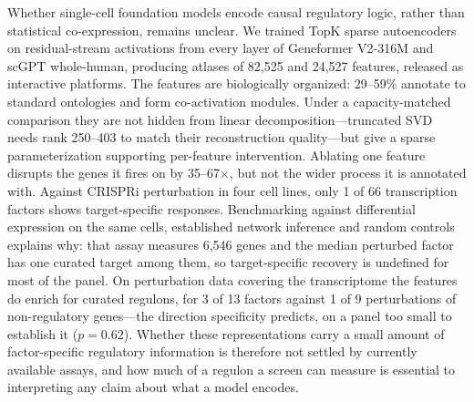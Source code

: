 Whether single-cell foundation models encode causal regulatory logic, rather than statistical
co-expression, remains unclear. We trained TopK sparse
autoencoders on residual-stream activations from every layer of Geneformer V2-316M and scGPT
whole-human, producing atlases of 82,525 and 24,527 features, released as interactive platforms. The features are biologically organized: 29--59\% annotate to standard ontologies and form
co-activation modules. Under a capacity-matched comparison they are not hidden from linear decomposition---truncated SVD
needs rank 250--403 to match their reconstruction quality---but give a sparse parameterization
supporting per-feature intervention. Ablating one feature disrupts the genes it fires on by 35--67$\times$, but not the wider
process it is annotated with. Against CRISPRi perturbation in four cell lines,
only 1 of 66 transcription factors shows target-specific responses. Benchmarking against differential expression on the same cells, established network inference and
random controls explains why: that assay measures 6,546 genes and the median perturbed factor has
one curated target among them, so target-specific recovery is undefined for most of the panel. On perturbation data covering the transcriptome the
features do enrich for curated regulons, for 3 of 13 factors against 1 of 9 perturbations of
non-regulatory genes---the direction specificity predicts, on a panel too small to establish it
($p = 0.62$). Whether these representations carry a small amount of factor-specific
regulatory information is therefore not settled by currently available assays, and how much of a
regulon a screen can measure is essential to interpreting any claim about what a model encodes.
